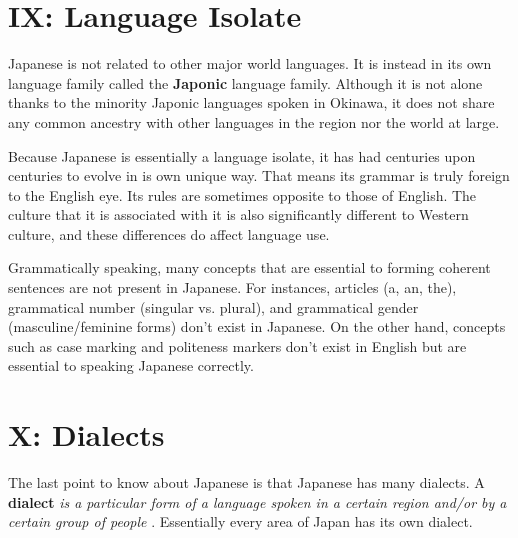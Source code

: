 \section{IX: Language Isolate}
 
\par{ Japanese is not related to other major world languages. It is instead in its own language family called the \textbf{Japonic }language family. Although it is not alone thanks to the minority Japonic languages spoken in Okinawa, it does not share any common ancestry with other languages in the region nor the world at large. }

\par{ Because Japanese is essentially a language isolate, it has had centuries upon centuries to evolve in is own unique way. That means its grammar is truly foreign to the English eye. Its rules are sometimes opposite to those of English. The culture that it is associated with it is also significantly different to Western culture, and these differences do affect language use. }

\par{ Grammatically speaking, many concepts that are essential to forming coherent sentences are not present in Japanese. For instances, articles (a, an, the), grammatical number (singular vs. plural), and grammatical gender (masculine\slash feminine forms) don't exist in Japanese. On the other hand, concepts such as case marking and politeness markers don't exist in English but are essential to speaking Japanese correctly. }
      
\section{X: Dialects}
 
\par{  The last point to know about Japanese is that Japanese has many dialects. A \textbf{dialect }\emph{is a particular form of a language spoken in a certain region and\slash or by a certain group of people }. Essentially every area of Japan has its own dialect. }

